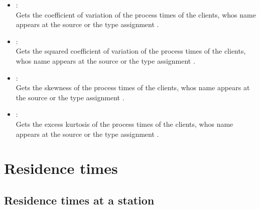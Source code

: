 \begin{itemize}
\item
{}:\\
Gets the coefficient of variation of the process times of the clients, whos name appears at the source or the type assignment .

\item
{}:\\
Gets the squared coefficient of variation of the process times of the clients, whos name appears at the source or the type assignment .

\item
{}:\\
Gets the skewness of the process times of the clients, whos name appears at the source or the type assignment .

\item
{}:\\
Gets the excess kurtosis of the process times of the clients, whos name appears at the source or the type assignment .

\end{itemize}



\section{Residence times}



\subsection{Residence times at a station}


